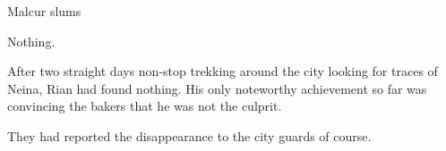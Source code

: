 \stamp
  {\dateRianLooksForNeina}
  {Malcur slums}

\begin{comment}
\subsection{Nothing}
\end{comment}

Nothing. 

After two straight days non-stop trekking around the city looking for traces of Neina, Rian had found nothing. 
His only noteworthy achievement so far was convincing the bakers that he was not the culprit. 

They had reported the disappearance to the city guards of course. 


